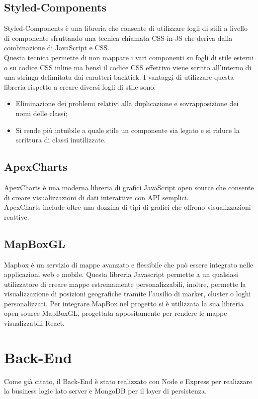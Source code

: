 \documentclass{report}
\begin{document}
\subsection{Styled-Components}
Styled-Components è una libreria che consente di utilizzare fogli di stili a livello di componente
sfruttando una tecnica chiamata CSS-in-JS che deriva dalla combinazione di JavaScript e CSS.
\\Questa tecnica permette di non mappare i vari componenti su fogli di stile esterni o su codice CSS inline ma bensì il codice CSS effettivo viene scritto
all’interno di una stringa delimitata dai caratteri backtick.
I vantaggi di utilizzare questa libreria rispetto a creare diversi fogli di
stile sono: 
\begin{itemize}
\item Eliminazione dei problemi relativi alla duplicazione e sovrapposizione dei nomi delle classi;
\item Si rende più intuibile a quale stile un componente sia legato e si riduce la scrittura di classi inutilizzate.
\end{itemize}
\subsection{ApexCharts}
ApexCharts è una moderna libreria di grafici JavaScript open source che consente di creare visualizzazioni di dati interattive con API semplici. 
\\ApexCharts include oltre una dozzina di tipi di grafici che offrono visualizzazioni reattive. 
\subsection{MapBoxGL}
Mapbox è un servizio di mappe avanzato e flessibile che può essere
integrato nelle applicazioni web e mobile. Questa libreria Javascript permette a un qualsiasi utilizzatore di creare
mappe estremamente personalizzabili, inoltre, permette la visualizzazione di
posizioni geografiche tramite l’ausilio di marker, cluster o loghi
personalizzati. Per integrare MapBox nel progetto si è utilizzata la sua libreria open source MapBoxGL, progettata appositamente per rendere le mappe visualizzabili React.

\section{Back-End}
Come già citato, il Back-End è stato realizzato con Node e Express per realizzare la business logic lato server e MongoDB per il layer di persistenza.
\end{document}
